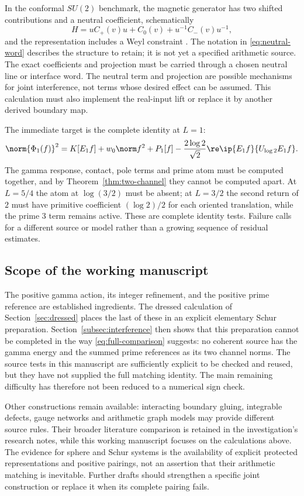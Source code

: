 In the conformal $SU(2)$ benchmark, the magnetic generator has two
shifted contributions and a neutral coefficient, schematically
\begin{equation}\label{eq:neutral-word}
 H=uC_+(v)u+C_0(v)+u^{-1}C_-(v)u^{-1},
\end{equation}
and the representation includes a Weyl constraint
\cite[Sections 5.1.2--5.1.3]{Schur}. The notation in
\eqref{eq:neutral-word} describes the structure to retain; it is not
yet a specified arithmetic source. The exact coefficients and projection
must be carried through a chosen neutral line or interface word. The
neutral term and projection are possible mechanisms for joint
interference, not terms whose desired effect can be assumed. This
calculation must also implement the real-input lift or replace it by
another derived boundary map.

The immediate target is the complete identity at $L=1$:
\begin{equation}\label{eq:first-target}
 \norm{\Phi_1(f)}^2=K[E_1f]+w_0\norm f^2+P_1[f]
 -\frac{2\log2}{\sqrt2}\re\ip{E_1f}{U_{\log2}E_1f}.
\end{equation}
The gamma response, contact, pole terms and prime atom must be computed
together, and by Theorem~\ref{thm:two-channel} they cannot be computed
apart. At $L=5/4$ the atom at $\log(3/2)$ must be absent; at $L=3/2$
the second return of $2$ must have primitive coefficient $(\log2)/2$
for each oriented translation, while the prime $3$ term remains active.
These are complete identity tests. Failure calls for a different source
or model rather than a growing sequence of residual estimates.

\subsection{Scope of the working manuscript}
The positive gamma action, its integer refinement, and the positive
prime reference are established ingredients. The dressed calculation of
Section~\ref{sec:dressed} places the last of these in an explicit elementary
Schur preparation. Section~\ref{subsec:interference} then shows that this
preparation cannot be completed in the way \eqref{eq:full-comparison}
suggests: no coherent source has the gamma energy and the summed prime
references as its two channel norms. The source tests in this manuscript are
sufficiently explicit to be checked and reused, but they have not supplied
the full matching identity. The main remaining difficulty has therefore not
been reduced to a numerical sign check.

Other constructions remain available: interacting boundary gluing,
integrable defects, gauge networks and arithmetic graph models may
provide different source rules. Their broader literature comparison
is retained in the investigation's research notes, while this working
manuscript focuses on the calculations above. The evidence for sphere
and Schur systems is the availability of explicit protected
representations and positive pairings, not an assertion that their
arithmetic matching is inevitable. Further drafts should strengthen a
specific joint construction or replace it when its complete pairing fails.
